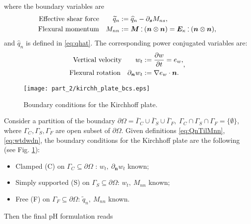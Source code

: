 where the boundary variables are 
\begin{equation}
\label{eq:QnTilMnn}
\begin{aligned}
\text{Effective shear force}  \qquad \widetilde{q}_{n} &:= \widehat{q}_n - \partial_{\bm{s}}{M_{ns}},  \\
\text{Flexural momentum} \quad M_{nn} &:=  \bm{M} \cddot (\bm{n}\otimes{\bm{n}}) = \bm{E}_{\kappa} \cddot (\bm{n}\otimes{\bm{n}}),
\end{aligned}
\end{equation}
and $\widehat{q}_n$ is defined in \eqref{eq:qhat}. The corresponding power conjugated variables are:
\begin{equation}
\label{eq:wtdwdn}
\begin{aligned}
\text{Vertical velocity}  \qquad w_t &:= \diffp{w}{t} = e_w, \\
\text{Flexural rotation} \quad 
\partial_{\bm{n}}{w_t} &:= \nabla{e_w} \cdot \bm{n}.
\end{aligned},
\end{equation}

\begin{figure}[tb]
	\centering
	\texttt{[image: part\_2/kirchh\_plate\_bcs.eps]}
	\caption{Boundary conditions for the Kirchhoff plate.}
	\label{fig:bcs_kirchh}
\end{figure}
Consider a partition of the boundary $\partial \Omega  = \overline{\Gamma}_{C} \cup \overline{\Gamma}_{S} \cup \overline{\Gamma}_{F}, \; {\Gamma}_{C} \cap {\Gamma}_{S} \cap {\Gamma}_{F} = \{\emptyset\}$, where ${\Gamma}_{C}, {\Gamma}_{S}, {\Gamma}_{F}$ are open subset of $\partial\Omega$. Given definitions \eqref{eq:QnTilMnn}, \eqref{eq:wtdwdn}, the boundary conditions for the Kirchhoff plate \cite{gustafsson2018} are the following (see Fig. \ref{fig:bcs_kirchh}):
\begin{itemize}
	\item Clamped (C) on $\Gamma_{C}\subseteq \partial \Omega$ : $w_t, \ \partial_{\bm{n}}{w_t}$ known;
	\item Simply supported (S) on $\Gamma_{S}\subseteq \partial \Omega$: $w_t, \ M_{nn}$ known;
	\item Free (F) on $\Gamma_{F}\subseteq \partial \Omega$: $\widetilde{q}_n, \ M_{nn}$ known.
\end{itemize}
Then the final pH formulation reads

